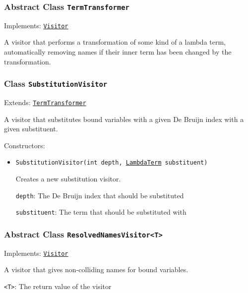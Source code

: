 \subsubsection{Abstract Class \texttt{TermTransformer}}
\label{type:edu.kit.wavelength.client.model.term.TermTransformer}
Implements: \texttt{\hyperref[type:edu.kit.wavelength.client.model.term.Visitor]{Visitor}}

A visitor that performs a transformation of some kind of a lambda term,
 automatically removing names if their inner term has been changed by
 the transformation.

\subsubsection{Class \texttt{SubstitutionVisitor}}
\label{type:edu.kit.wavelength.client.model.term.SubstitutionVisitor}
Extends: \texttt{\hyperref[type:edu.kit.wavelength.client.model.term.TermTransformer]{TermTransformer}}

A visitor that substitutes bound variables with a given De Bruijn
 index with a given substituent.

Constructors:
\begin{itemize}
\item \texttt{SubstitutionVisitor(int depth, \hyperref[type:edu.kit.wavelength.client.model.term.LambdaTerm]{LambdaTerm} substituent)}

Creates a new substitution visitor.

\texttt{depth}: The De Bruijn index that should be substituted

\texttt{substituent}: The term that should be substituted with

\end{itemize}

\subsubsection{Abstract Class \texttt{ResolvedNamesVisitor<T>}}
\label{type:edu.kit.wavelength.client.model.term.ResolvedNamesVisitor}
Implements: \texttt{\hyperref[type:edu.kit.wavelength.client.model.term.Visitor]{Visitor}}

A visitor that gives non-colliding names for bound variables.

\texttt{<T>}: The return value of the visitor

